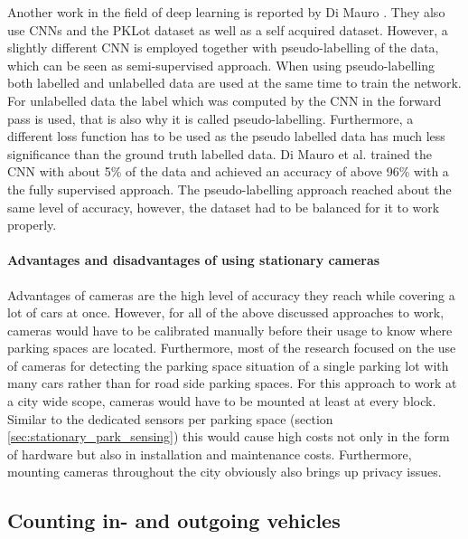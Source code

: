 Another work in the field of deep learning is reported by Di Mauro \cite{DiMauro2016}. They also use CNNs and the PKLot dataset as well as a self acquired dataset. However, a slightly different CNN is employed together with pseudo-labelling of the data, which can be seen as semi-supervised approach. When using pseudo-labelling both labelled and unlabelled data are used at the same time to train the network. For unlabelled data the label which was computed by the CNN in the forward pass is used, that is also why it is called pseudo-labelling. Furthermore, a different loss function has to be used as the pseudo labelled data has much less significance than the ground truth labelled data. Di Mauro et al. trained the CNN with about 5\% of the data and achieved an accuracy of above 96\% with a the fully supervised approach. The pseudo-labelling approach reached about the same level of accuracy, however, the dataset had to be balanced for it to work properly.


\paragraph{Advantages and disadvantages of using stationary cameras}

Advantages of cameras are the high level of accuracy they reach while covering a lot of cars at once. However, for all of the above discussed approaches to work, cameras would have to be calibrated manually before their usage to know where parking spaces are located. Furthermore, most of the research focused on the use of cameras for detecting the parking space situation of a single parking lot with many cars rather than for road side parking spaces. For this approach to work at a city wide scope, cameras would have to be mounted at least at every block. Similar to the dedicated sensors per parking space (section \ref{sec:stationary_park_sensing}) this would cause high costs not only in the form of hardware but also in installation and maintenance costs. Furthermore, mounting cameras throughout the city obviously also brings up privacy issues.





\subsection{Counting in- and outgoing vehicles}
\label{sec:counting_in_out_park_sensing}


